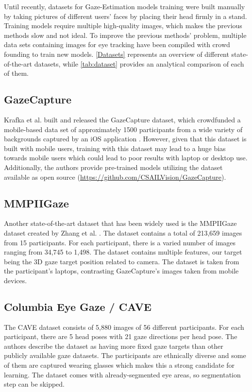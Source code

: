 Until recently, datasets for Gaze-Estimation models training were built manually by taking pictures of different users' faces by placing their head firmly in a stand. Training models require multiple high-quality images, which makes the previous methods slow and not ideal.
To improve the previous methods' problem, multiple data sets containing images for eye tracking have been compiled with crowd founding to train new models.
\autoref{Datasets} represents an overview of different state-of-the-art datasets, while \autoref{tab:dataset} provides an analytical comparison of each of them.

\subsection{GazeCapture}
Krafka et al. built and released the GazeCapture dataset, which crowdfunded a mobile-based data set of approximately 1500 participants from a wide variety of backgrounds captured by an iOS application \cite{GazeCapture}. However, given that this dataset is built with mobile users, training with this dataset may lead to a huge bias towards mobile users which could lead to poor results with laptop or desktop use.
Additionally, the authors provide pre-trained models utilizing the dataset available as open source (\url{https://github.com/CSAILVision/GazeCapture}).

\subsection{MMPIIGaze}
Another state-of-the-art dataset that has been widely used is the MMPIIGaze dataset created by Zhang et al. \cite{GazeEstimationInTheWild}.
The dataset contains a total of 213,659 images from 15 participants. For each participant, there is a varied number of
images ranging from 34,745 to 1,498. The dataset contains multiple features, our target being the 3D gaze target position related to camera.
The dataset is taken from the participant's laptops, contrasting GazeCapture's images taken from mobile devices.

\subsection{Columbia Eye Gaze / CAVE}
The CAVE dataset \cite{CAVE_0324} consists of 5,880 images of 56 different participants. For each participant, there are 5 head poses with 21 gaze directions per head pose. The authors describe the dataset as having more fixed gaze targets than other publicly available gaze datasets. The participants are ethnically diverse and some of them are captured wearing glasses which makes this a strong candidate for learning. The dataset comes with already-segmented eye areas, so segmentation step can be skipped.

